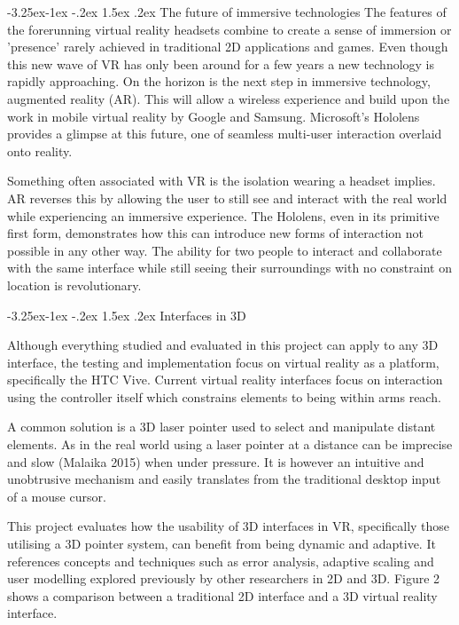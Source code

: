 \documentclass[12pt]{article}
\makeatletter
\renewcommand{\subsection}{\@startsection{subsection}{2}{\z@}%
             {-3.25ex\@plus -1ex \@minus -.2ex}%
             {1.5ex \@plus .2ex}%
             {\normalfont\large\scshape\bfseries}}
\makeatother
\begin{document}
\subsection{The future of immersive technologies}
The features of the forerunning virtual reality headsets combine to create a sense of immersion or 'presence' rarely achieved in traditional 2D applications and games. Even though this new wave of VR has only been around for a few years a new technology is rapidly approaching. On the horizon is the next step in immersive technology, augmented reality (AR). This will allow a wireless experience and build upon the work in mobile virtual reality by Google and Samsung. Microsoft's Hololens provides a glimpse at this future, one of seamless multi-user interaction overlaid onto reality. 

Something often associated with VR is the isolation wearing a headset implies. AR reverses this by allowing the user to still see and interact with the real world while experiencing an immersive experience. The Hololens, even in its primitive first form, demonstrates how this can introduce new forms of interaction not possible in any other way. The ability for two people to interact and collaborate with the same interface while still seeing their surroundings with no constraint on location is revolutionary.

\subsection{Interfaces in 3D}

Although everything studied and evaluated in this project can apply to any 3D interface, the testing and implementation focus on virtual reality as a platform, specifically the HTC Vive. Current virtual reality interfaces focus on interaction using the controller itself which constrains elements to being within arms reach.

A common solution is a 3D laser pointer used to select and manipulate distant elements. As in the real world using a laser pointer at a distance can be imprecise and slow (Malaika 2015) when under pressure. It is however an intuitive and unobtrusive mechanism and easily translates from the traditional desktop input of a mouse cursor.

This project evaluates how the usability of 3D interfaces in VR, specifically those utilising a 3D pointer system, can benefit from being dynamic and adaptive. It references concepts and techniques such as error analysis, adaptive scaling and user modelling explored previously by other researchers in 2D and 3D. Figure 2 shows a comparison between a traditional 2D interface and a 3D virtual reality interface.
\end{document}
